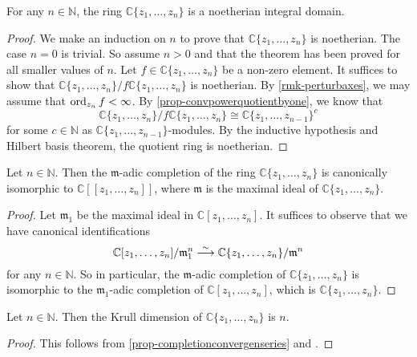 \begin{thm}\label{thm-localringnoetherian}
    For any $n\in \mathbb{N}$, the ring $\mathbb{C}\{ z_1,\ldots,z_n \}$ is a noetherian integral domain.
\end{thm}
\begin{proof}
    We make an induction on $n$ to prove that $\mathbb{C}\{ z_1,\ldots,z_n \}$ is noetherian. The case $n=0$ is trivial. So assume $n>0$ and that the theorem has been proved for all smaller values of $n$. Let $f\in\mathbb{C}\{ z_1,\ldots,z_n \}$ be a non-zero element. It suffices to show that $\mathbb{C}\{ z_1,\ldots,z_n \}/f\mathbb{C}\{ z_1,\ldots,z_n \}$ is noetherian. By \cref{rmk-perturbaxes}, we may assume that $\operatorname{ord}_{z_n}f<\infty$.
    By \cref{prop-convpowerquotientbyone}, we know that 
    \[
        \mathbb{C}\{ z_1,\ldots,z_n \}/f\mathbb{C}\{ z_1,\ldots,z_n \}\cong \mathbb{C}\{ z_1,\ldots,z_{n-1} \}^c
    \]
    for some $c\in \mathbb{N}$ as $\mathbb{C}\{ z_1,\ldots,z_{n-1} \}$-modules. By the inductive hypothesis and Hilbert basis theorem, the quotient ring is noetherian.
\end{proof}


\begin{proposition}\label{prop-completionconvergenseries}
    Let $n\in \mathbb{N}$. Then the $\mathfrak{m}$-adic completion of the ring  $\mathbb{C}\{ z_1,\ldots,z_n \}$ is canonically isomorphic to $\mathbb{C}[[ z_1,\ldots,z_n ]]$, where $\mathfrak{m}$ is the maximal ideal of $\mathbb{C}\{ z_1,\ldots,z_n \}$. 
\end{proposition}
\begin{proof}
    Let $\mathfrak{m}_1$ be the maximal ideal in $\mathbb{C}[z_1,\ldots,z_n]$. It suffices to observe that we have canonical identifications
    \[
        \mathbb{C}[z_1,\ldots,z_n]/\mathfrak{m}_1^n\stackrel{\sim}{\longrightarrow} \mathbb{C}\{ z_1,\ldots,z_n\}/\mathfrak{m}^n
    \]
    for any $n\in \mathbb{N}$. So in particular, the $\mathfrak{m}$-adic completion of $\mathbb{C}\{ z_1,\ldots,z_n \}$ is isomorphic to the $\mathfrak{m}_1$-adic completion of $\mathbb{C}[z_1,\ldots,z_n]$, which is $\mathbb{C}\{ z_1,\ldots,z_n \}$.
\end{proof}

\begin{corollary}
    Let $n\in \mathbb{N}$. Then the Krull dimension of $\mathbb{C}\{ z_1,\ldots,z_n \}$ is $n$.
\end{corollary}
\begin{proof}
    This follows from \cref{prop-completionconvergenseries} and \cite[\href{https://stacks.math.columbia.edu/tag/07NV}{Tag 07NV}]{stacks-project}.
\end{proof}

